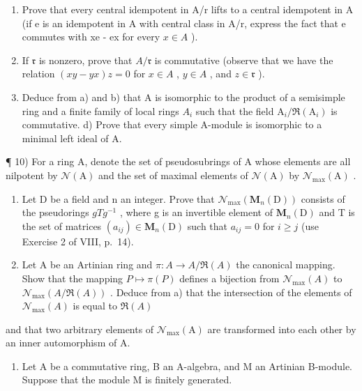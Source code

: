 \begin{enumerate}
\def\labelenumi{\alph{enumi})}
\item
  Prove that every central idempotent in A/r lifts to a central idempotent in A (if e is an idempotent in A with central class in A/r, express the fact that e commutes with xe - ex for every \(x \in A\) ).
\item
  If \(\mathfrak{r}\) is nonzero, prove that \(A / \mathfrak{r}\) is commutative (observe that we have the relation \((xy - yx)z = 0\) for \(x\in A\) , \(y\in A\) , and \(z\in \mathfrak{r}\) ).
\item
  Deduce from a) and b) that A is isomorphic to the product of a semisimple ring and a finite family of local rings \(A_{i}\) such that the field \(\mathrm{A}_{i}/\Re(\mathrm{A}_{i})\) is commutative. d) Prove that every simple A-module is isomorphic to a minimal left ideal of A.
\end{enumerate}

¶ 10) For a ring A, denote the set of pseudosubrings of A whose elements are all nilpotent by \(\mathcal{N}(\mathrm{A})\) and the set of maximal elements of \(\mathcal{N}(\mathrm{A})\) by \(\mathcal{N}_{\max}(\mathrm{A})\) .

\begin{enumerate}
\def\labelenumi{\alph{enumi})}
\tightlist
\item
  Let D be a field and n an integer. Prove that \(\mathcal{N}_{\max}(\mathbf{M}_{n}(\mathrm{D}))\) consists of the pseudorings \(gTg^{-1}\) , where g is an invertible element of \(\mathbf{M}_{n}(\mathrm{D})\) and T is the set of matrices \((a_{ij})\in\mathbf{M}_{n}(\mathrm{D})\) such that \(a_{ij}=0\) for \(i\geqslant j\) (use Exercise 2 of VIII, p.~14).
\item
  Let A be an Artinian ring and \(\pi:A\to A/\Re(A)\) the canonical mapping. Show that the mapping \(P\mapsto\pi(P)\) defines a bijection from \(\mathcal{N}_{\max}(A)\) to \(\mathcal{N}_{\max}(A/\Re(A))\) . Deduce from a) that the intersection of the elements of \(\mathcal{N}_{\max}(A)\) is equal to \(\Re(A)\)
\end{enumerate}

and that two arbitrary elements of \(\mathcal{N}_{\mathrm{max}}(\mathrm{A})\) are transformed into each other by an inner automorphism of A.

\begin{enumerate}
\def\labelenumi{\arabic{enumi})}
\setcounter{enumi}{10}
\tightlist
\item
  Let A be a commutative ring, B an A-algebra, and M an Artinian B-module. Suppose that the module M is finitely generated.
\end{enumerate}

